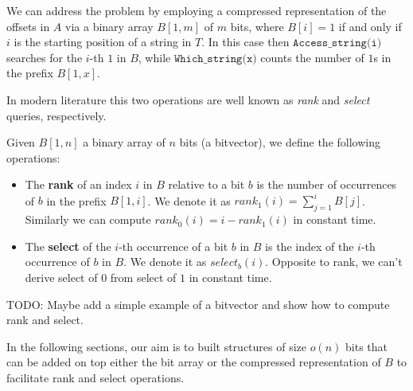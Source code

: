 \noindent We can address the problem by employing a compressed representation of the offsets in $A$ via a binary array $B[1,m]$ of $m$ bits, where $B[i] = 1$ if and only if $i$ is the starting position of a string in $T$. In this case then $\texttt{Access\_string(i)}$ searches for the $i$-th $1$ in $B$, while $\texttt{Which\_string(x)}$ counts the number of $1$s in the prefix $B[1,x]$. \vspace{0.4cm}

\noindent In modern literature this two operations are well known as \textit{rank} and \textit{select} queries, respectively.
\begin{definition}\label{def:rankselect}
    Given $B[1,n]$ a binary array of $n$ bits (a bitvector), we define the following operations:
    \begin{itemize}
        \item The \textbf{rank} of an index $i$ in $B$ relative to a bit $b$ is the number of occurrences of $b$ in the prefix $B[1,i]$. We denote it as $rank_1(i) = \sum_{j=1}^{i} B[j]$. Similarly we can compute $rank_0(i) = i - rank_1(i)$ in constant time.
        \item The \textbf{select} of the $i$-th occurrence of a bit $b$ in $B$ is the index of the $i$-th occurrence of $b$ in $B$. We denote it as $select_b(i)$. Opposite to rank, we can't derive select of $0$ from select of $1$ in constant time.
    \end{itemize}
\end{definition}
\begin{example}
    TODO: Maybe add a simple example of a bitvector and show how to compute rank and select.
\end{example}
\noindent In the following sections, our aim is to built structures of size $o(n)$ bits that can be added on top either the bit array or the compressed representation of $B$ to facilitate rank and select operations. \vspace{0.4cm}

